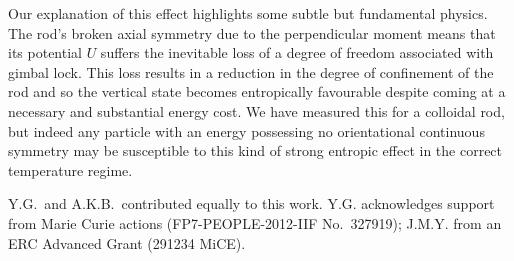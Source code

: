 \documentclass[aps,prl,reprint,twocolumn,superscriptaddress,showpacs]{revtex4-1}
\newcommand{\vcrm}[1]{\mathbf{#1}}
\newcommand{\hvcrm}[1]{\mathbf{\hat{#1}}}
\newcommand{\vc}[1]{\boldsymbol{#1}}
\newcommand{\hvc}[1]{\boldsymbol{\hat{#1}}}
\newcommand{\kk}{\mathrm{k}_B}
\begin{document}
%
%
%
%
%
%
%

Our explanation of this effect highlights some subtle but fundamental physics. The rod's broken axial symmetry due to the perpendicular moment means that its potential $U$ suffers the inevitable loss of a degree of freedom associated with gimbal lock. This loss results in a reduction in the degree of confinement of the rod and so the vertical state becomes entropically favourable despite coming at a necessary and substantial energy cost. We have measured this for a colloidal rod, but indeed any particle with an energy possessing no orientational continuous symmetry may be susceptible to this kind of strong entropic effect in the correct temperature regime.
  
Y.G.\ and A.K.B.\ contributed equally to this work. Y.G. acknowledges support from Marie Curie actions (FP7-PEOPLE-2012-IIF No.\ 327919); J.M.Y. from an ERC Advanced Grant (291234 MiCE).

\end{document}
